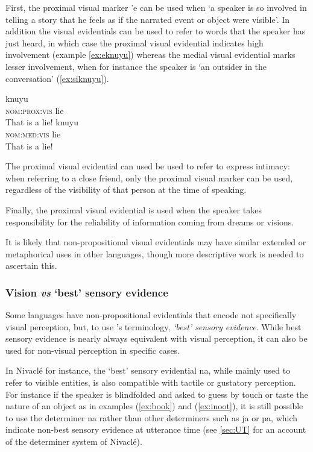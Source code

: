 \documentclass[oneside,a4paper,11pt]{article}
\newcommand{\ipa}[1]{{\phon \mbox{#1}}} %
\begin{document}
First, the proximal visual marker \ipa{'e} can be used when `a speaker is so involved in telling a story that he feels as if the narrated event or object were visible'. In addition the visual evidentials can be used to refer to words that the speaker has just heard, in which case the proximal visual evidential indicates high involvement (example \ref{ex:eknuyu}) whereas the medial visual evidential marks lesser involvement, when for instance the speaker is `an outsider in the conversation' (\ref{ex:siknuyu}).

\begin{exe}
\ex \label{ex:eknuyu}
\gll \ipa{'e} \ipa{knuyu} \\
\textsc{nom:prox:vis} lie \\
\glt That is a lie!
\ex \label{ex:siknuyu}
\gll \ipa{si} \ipa{knuyu} \\
\textsc{nom:med:vis} lie \\
\glt That is a lie!
\end{exe}

The proximal visual evidential can used be used to refer to express intimacy: when referring to a close friend, only the proximal visual marker can be used, regardless of the visibility of that person at the time of speaking.

Finally, the proximal visual evidential is used when the speaker takes responsibility for the reliability of information coming from dreams or visions.

It is likely that non-propositional visual evidentials may have similar extended or metaphorical uses in other languages, though more descriptive work is needed to ascertain this.

\subsubsection{Vision \textit{vs} `best' sensory evidence}
Some languages have non-propositional evidentials that encode not specifically visual perception, but, to use \citet{gutierrez11evidentiality}'s terminology, \textit{`best' sensory evidence}. While best sensory evidence is nearly always equivalent with visual perception, it can also be used for non-visual perception in specific cases. 

In Nivaclé for instance, the `best' sensory evidential \ipa{na}, while mainly used to refer to visible entities, is also compatible with tactile or gustatory perception. For instance if the speaker is blindfolded and asked to guess by touch or taste the nature of an object as in examples (\ref{ex:book}) and (\ref{ex:inoot}), it is still possible to use the determiner \ipa{na} rather than other determiners such as \ipa{ja} or \ipa{pa}, which indicate non-best sensory evidence at utterance time (see \ref{sec:UT} for an account of the determiner system of Nivaclé).
\end{document}
